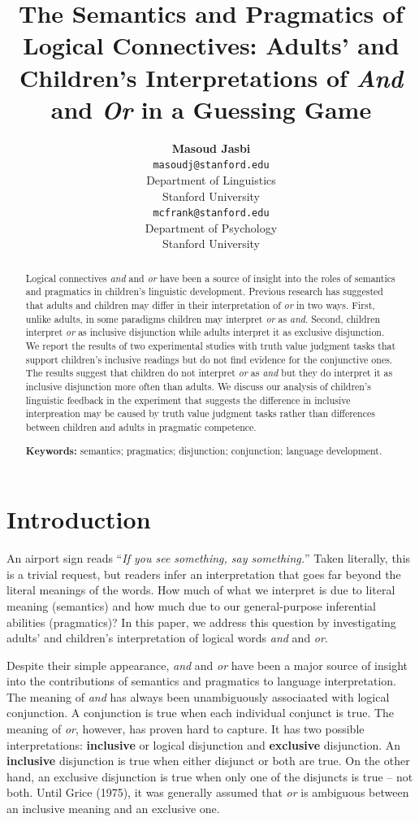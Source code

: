\documentclass[10pt, letterpaper]{article}
\title{The Semantics and Pragmatics of Logical Connectives: Adults' and
Children's Interpretations of \emph{And} and \emph{Or} in a Guessing
Game}
\author{{\large \bf Masoud Jasbi} \\ \texttt{masoudj@stanford.edu} \\ Department of Linguistics \\ Stanford University \And {\large \bf Michael C. Frank} \\ \texttt{mcfrank@stanford.edu} \\ Department of Psychology \\ Stanford University}
\begin{document}
\maketitle

\begin{abstract}
Logical connectives \emph{and} and \emph{or} have been a source of
insight into the roles of semantics and pragmatics in children's
linguistic development. Previous research has suggested that adults and
children may differ in their interpretation of \emph{or} in two ways.
First, unlike adults, in some paradigms children may interpret \emph{or}
as \emph{and}. Second, children interpret \emph{or} as inclusive
disjunction while adults interpret it as exclusive disjunction. We
report the results of two experimental studies with truth value judgment
tasks that support children's inclusive readings but do not find
evidence for the conjunctive ones. The results suggest that children do
not interpret \emph{or} as \emph{and} but they do interpret it as
inclusive disjunction more often than adults. We discuss our analysis of
children's linguistic feedback in the experiment that suggests the
difference in inclusive interpreation may be caused by truth value
judgment tasks rather than differences between children and adults in
pragmatic competence.

\textbf{Keywords:}
semantics; pragmatics; disjunction; conjunction; language development.
\end{abstract}

\section{Introduction}\label{introduction}

An airport sign reads ``\emph{If you see something, say something.}''
Taken literally, this is a trivial request, but readers infer an
interpretation that goes far beyond the literal meanings of the words.
How much of what we interpret is due to literal meaning (semantics) and
how much due to our general-purpose inferential abilities (pragmatics)?
In this paper, we address this question by investigating adults' and
children's interpretation of logical words \emph{and} and \emph{or}.

Despite their simple appearance, \emph{and} and \emph{or} have been a
major source of insight into the contributions of semantics and
pragmatics to language interpretation. The meaning of \emph{and} has
always been unambiguously associaated with logical conjunction. A
conjunction is true when each individual conjunct is true. The meaning
of \emph{or}, however, has proven hard to capture. It has two possible
interpretations: \textbf{inclusive} or logical disjunction and
\textbf{exclusive} disjunction. An \textbf{inclusive} disjunction is
true when either disjunct or both are true. On the other hand, an
exclusive disjunction is true when only one of the disjuncts is true --
not both. Until Grice (1975), it was generally assumed that \emph{or} is
ambiguous between an inclusive meaning and an exclusive one.
\end{document}
